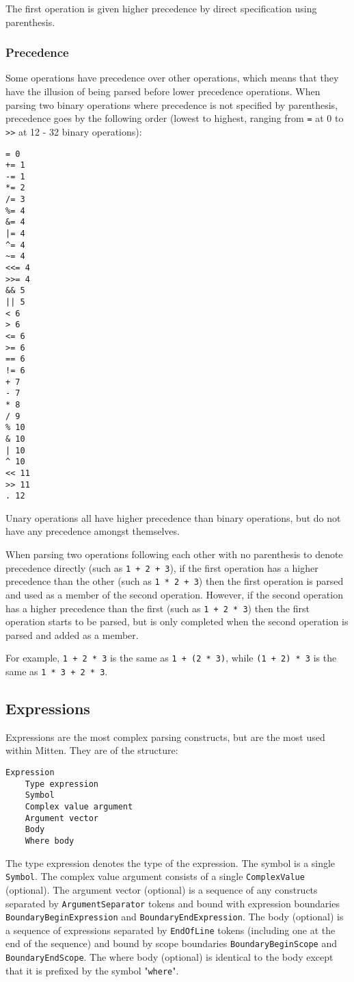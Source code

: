 \documentclass[10pt,a4paper]{article}
\begin{document}
The first operation is given higher precedence by direct specification using parenthesis. 

\subsubsection{Precedence}
\label{sec:precedence}
Some operations have precedence over other operations, which means that they have the illusion of being parsed before lower precedence operations. When parsing two binary operations where precedence is not specified by parenthesis, precedence goes by the following order (lowest to highest, ranging from \verb|=| at 0 to \verb|>>| at 12 - 32 binary operations):
\begin{verbatim}
= 0
+= 1
-= 1
*= 2
/= 3
%= 4
&= 4
|= 4
^= 4
~= 4
<<= 4
>>= 4
&& 5
|| 5
< 6
> 6
<= 6
>= 6
== 6
!= 6
+ 7
- 7
* 8
/ 9
% 10
& 10
| 10
^ 10
<< 11
>> 11
. 12
\end{verbatim}

Unary operations all have higher precedence than binary operations, but do not have any precedence amongst themselves.

When parsing two operations following each other with no parenthesis to denote precedence directly (such as \verb|1 + 2 + 3|), if the first operation has a higher precedence than the other (such as \verb|1 * 2 + 3|) then the first operation is parsed and used as a member of the second operation. However, if the second operation has a higher precedence than the first (such as \verb|1 + 2 * 3|) then the first operation starts to be parsed, but is only completed when the second operation is parsed and added as a member.

For example, \verb|1 + 2 * 3| is the same as \verb|1 + (2 * 3)|, while \verb|(1 + 2) * 3| is the same as \verb|1 * 3 + 2 * 3|.

\subsection{Expressions}
\label{sec:expressions}
Expressions are the most complex parsing constructs, but are the most used within Mitten. They are of the structure:
\begin{verbatim}
Expression
    Type expression
    Symbol
    Complex value argument
    Argument vector
    Body
    Where body
\end{verbatim}

The type expression denotes the type of the expression. The symbol is a single \verb|Symbol|. The complex value argument consists of a single \verb|ComplexValue| (optional). The argument vector (optional) is a sequence of any constructs separated by \verb|ArgumentSeparator| tokens and bound with expression boundaries \verb|BoundaryBeginExpression| and \verb|BoundaryEndExpression|. The body (optional) is a sequence of expressions separated by \verb|EndOfLine| tokens (including one at the end of the sequence) and bound by scope boundaries \verb|BoundaryBeginScope| and \verb|BoundaryEndScope|. The where body (optional) is identical to the body except that it is prefixed by the symbol "\verb|where|".
\end{document}

